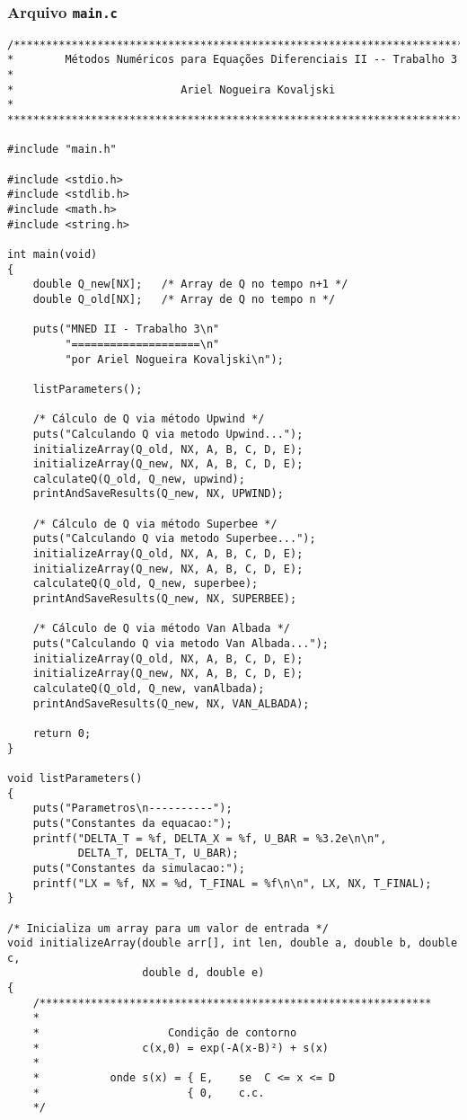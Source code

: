 \subsubsection{Arquivo \texttt{main.c}}
\begin{Verbatim}[fontsize=\footnotesize]
/******************************************************************************
*        Métodos Numéricos para Equações Diferenciais II -- Trabalho 3       *
*                          Ariel Nogueira Kovaljski                          *
******************************************************************************/

#include "main.h"

#include <stdio.h>
#include <stdlib.h>
#include <math.h>
#include <string.h>

int main(void)
{
    double Q_new[NX];   /* Array de Q no tempo n+1 */
    double Q_old[NX];   /* Array de Q no tempo n */

    puts("MNED II - Trabalho 3\n"
         "====================\n"
         "por Ariel Nogueira Kovaljski\n");

    listParameters();

    /* Cálculo de Q via método Upwind */
    puts("Calculando Q via metodo Upwind...");
    initializeArray(Q_old, NX, A, B, C, D, E);
    initializeArray(Q_new, NX, A, B, C, D, E);
    calculateQ(Q_old, Q_new, upwind);
    printAndSaveResults(Q_new, NX, UPWIND);

    /* Cálculo de Q via método Superbee */
    puts("Calculando Q via metodo Superbee...");
    initializeArray(Q_old, NX, A, B, C, D, E);
    initializeArray(Q_new, NX, A, B, C, D, E);
    calculateQ(Q_old, Q_new, superbee);
    printAndSaveResults(Q_new, NX, SUPERBEE);

    /* Cálculo de Q via método Van Albada */
    puts("Calculando Q via metodo Van Albada...");
    initializeArray(Q_old, NX, A, B, C, D, E);
    initializeArray(Q_new, NX, A, B, C, D, E);
    calculateQ(Q_old, Q_new, vanAlbada);
    printAndSaveResults(Q_new, NX, VAN_ALBADA);

    return 0;
}

void listParameters()
{
    puts("Parametros\n----------");
    puts("Constantes da equacao:");
    printf("DELTA_T = %f, DELTA_X = %f, U_BAR = %3.2e\n\n",
           DELTA_T, DELTA_T, U_BAR);
    puts("Constantes da simulacao:");
    printf("LX = %f, NX = %d, T_FINAL = %f\n\n", LX, NX, T_FINAL);
}

/* Inicializa um array para um valor de entrada */
void initializeArray(double arr[], int len, double a, double b, double c,
                     double d, double e)
{
    /*************************************************************
    *
    *                    Condição de contorno
    *                c(x,0) = exp(-A(x-B)²) + s(x)
    *
    *           onde s(x) = { E,    se  C <= x <= D
    *                       { 0,    c.c.
    */


\end{Verbatim}
